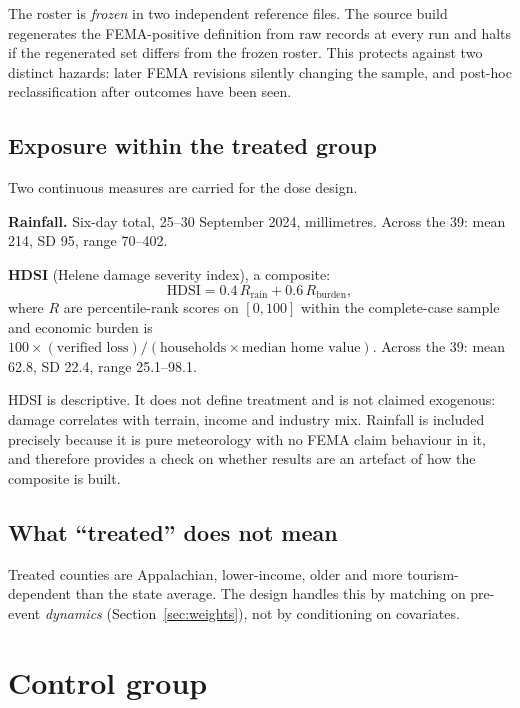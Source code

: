 \documentclass[11pt,a4paper]{article}
\begin{document}
The roster is \emph{frozen} in two independent reference files. The source build regenerates the
FEMA-positive definition from raw records at every run and halts if the regenerated set differs from
the frozen roster. This protects against two distinct hazards: later FEMA revisions silently changing
the sample, and post-hoc reclassification after outcomes have been seen.

\subsection{Exposure within the treated group}
Two continuous measures are carried for the dose design.

\textbf{Rainfall.} Six-day total, 25--30 September 2024, millimetres. Across the 39: mean 214,
SD 95, range 70--402.

\textbf{HDSI} (Helene damage severity index), a composite:
\begin{equation}
\text{HDSI}=0.4\,R_{\text{rain}}+0.6\,R_{\text{burden}},
\end{equation}
where $R$ are percentile-rank scores on $[0,100]$ within the complete-case sample and economic burden
is $100\times(\text{verified loss})/(\text{households}\times\text{median home value})$. Across the 39:
mean 62.8, SD 22.4, range 25.1--98.1.

HDSI is descriptive. It does not define treatment and is not claimed exogenous: damage correlates with
terrain, income and industry mix. Rainfall is included precisely because it is pure meteorology with no
FEMA claim behaviour in it, and therefore provides a check on whether results are an artefact of how
the composite is built.

\subsection{What ``treated'' does not mean}
Treated counties are Appalachian, lower-income, older and more tourism-dependent than the state
average. The design handles this by matching on pre-event \emph{dynamics} (Section~\ref{sec:weights}),
not by conditioning on covariates.

\section{Control group}
\end{document}
